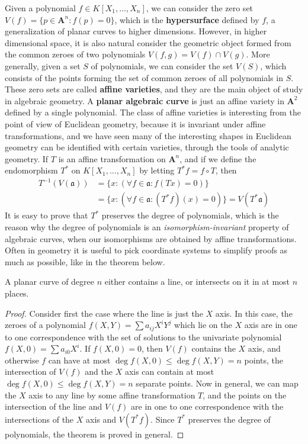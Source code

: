 Given a polynomial $f \in K[X_1, \dots, X_n]$, we can consider the zero set $V(f) = \{ p \in \mathbf{A}^n : f(p) = 0 \}$, which is the {\bf hypersurface} defined by $f$, a generalization of planar curves to higher dimensions. However, in higher dimensional space, it is also natural consider the geometric object formed from the common zeroes of two polynomials $V(f,g) = V(f) \cap V(g)$. More generally, given a set $S$ of polynomials, we can consider the set $V(S)$, which consists of the points forming the set of common zeroes of all polynomials in $S$. These zero sets are called {\bf affine varieties}, and they are the main object of study in algebraic geometry. A {\bf planar algebraic curve} is just an affine variety in $\mathbf{A}^2$ defined by a single polynomial. The class of affine varieties is interesting from the point of view of Euclidean geometry, because it is invariant under affine transformations, and we have seen many of the interesting shapes in Euclidean geometry can be identified with certain varieties, through the tools of analytic geometry. If $T$ is an affine transformation on $\mathbf{A}^n$, and if we define the endomorphism $T^*$ on $K[X_1, \dots, X_n]$ by letting $T^*f = f \circ T$, then
%
\begin{align*}
    T^{-1}(V(\mathfrak{a})) &= \{ x : (\forall f \in \mathfrak{a}: f(Tx) = 0) \}\\
    &= \{ x : (\forall f \in \mathfrak{a}: (T^*f)(x) = 0) \} = V(T^*\mathfrak{a})
\end{align*}
%
It is easy to prove that $T^*$ preserves the degree of polynomials, which is the reason why the degree of polynomials is an {\it isomorphism-invariant} property of algebraic curves, when our isomorphisms are obtained by affine transformations. Often in geometry it is useful to pick coordinate systems to simplify proofs as much as possible, like in the theorem below.

\begin{theorem}
    A planar curve of degree $n$ either contains a line, or intersects on it in at most $n$ places.
\end{theorem}
\begin{proof}
    Consider first the case where the line is just the $X$ axis. In this case, the zeroes of a polynomial $f(X,Y) = \sum a_{ij} X^iY^j$ which lie on the $X$ axis are in one to one correspondence with the set of solutions to the univariate polynomial $f(X,0) = \sum a_{i0} X^i$. If $f(X,0) = 0$, then $V(f)$ contains the $X$ axis, and otherwise $f$ can have at most $\deg f(X,0) \leq \deg f(X,Y) = n$ points, the intersection of $V(f)$ and the $X$ axis can contain at most $\deg f(X,0) \leq \deg f(X,Y) = n$ separate points. Now in general, we can map the $X$ axis to any line by some affine transformation $T$, and the points on the intersection of the line and $V(f)$ are in one to one correspondence with the intersections of the $X$ axis and $V(T^*f)$. Since $T^*$ preserves the degree of polynomials, the theorem is proved in general.
\end{proof}

